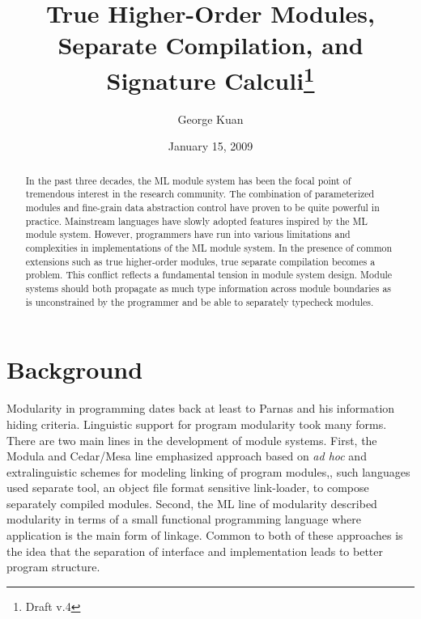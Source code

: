 \documentclass[12pt]{article}
\title{True Higher-Order Modules, Separate Compilation, and Signature Calculi\footnote{Draft v.4}}
\author{George Kuan}
\date{January 15, 2009}
\begin{document}
	\maketitle
	\lstset{language=ML,frame=single,basicstyle=\small}
\begin{abstract}
In the past three decades, the ML module system has been the focal point of tremendous interest in the research community. The combination of parameterized modules and fine-grain data abstraction control have proven to be quite powerful in practice. Mainstream languages have slowly adopted features inspired by the ML module system. However, programmers have run into various limitations and complexities in implementations of the ML module system. In the presence of common extensions such as true higher-order modules, true separate compilation becomes a problem. This conflict reflects a fundamental tension in module system design. Module systems should both propagate as much type information across module boundaries as is unconstrained by the programmer and be able to separately typecheck modules. 
\end{abstract}

\section{Background}
Modularity in programming dates back at least to Parnas and his information hiding criteria\cite{parnas72}. Linguistic support for program modularity took many forms. There are two main lines in the development of module systems. First, the Modula \cite{wirth:module} and Cedar/Mesa \cite{cacm:mesa} line emphasized approach based on {\it ad hoc} and extralinguistic schemes for modeling linking of program modules,\ie, such languages used separate tool, an object file format sensitive link-loader, to compose separately compiled modules.  Second, the ML line of modularity \cite{macqueen:lfp84,macqueen:popl86,macqueen:lfp88} described modularity in terms of a small functional programming language where application is the main form of linkage. Common to both of these approaches is the idea that the separation of interface and implementation leads to better program structure. 
\end{document}

